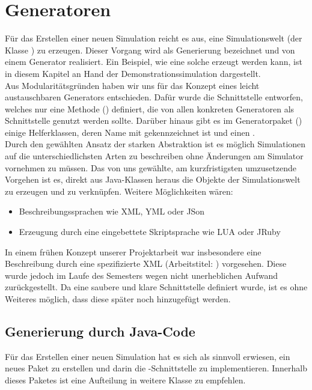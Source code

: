 \section{Generatoren}\label{subsec:real_generator}
Für das Erstellen einer neuen Simulation reicht es aus, eine Simulationswelt (der Klasse ) zu erzeugen. Dieser Vorgang wird als Generierung bezeichnet und von einem Generator realisiert.
Ein Beispiel, wie eine solche erzeugt werden kann, ist in diesem Kapitel an Hand der Demonstrationssimulation dargestellt.\\ 

Aus Modularitätsgründen haben wir uns für das Konzept eines leicht austauschbaren Generators entschieden. Dafür wurde die Schnittstelle  entworfen, welches nur eine Methode () definiert, die von allen konkreten Generatoren als Schnittstelle genutzt werden sollte.
Darüber hinaus gibt es im Generatorpaket () einige Helferklassen, deren Name mit  gekennzeichnet ist und einen .\\

Durch den gewählten Ansatz der starken Abstraktion ist es möglich Simulationen auf die unterschiedlichsten Arten zu beschreiben ohne Änderungen am Simulator vornehmen zu müssen. Das von uns gewählte, am kurzfristigsten umzusetzende Vorgehen ist es, direkt aus Java-Klassen heraus die Objekte der Simulationswelt zu erzeugen und zu verknüpfen. Weitere Möglichkeiten wären:
\begin{itemize}
  \item{Beschreibungssprachen wie XML, YML oder JSon}
  \item{Erzeugung durch eine eingebettete Skriptsprache wie LUA oder JRuby}
\end{itemize}
In einem frühen Konzept unserer Projektarbeit war insbesondere eine Beschreibung durch eine spezifizierte XML (Arbeitstitel: ) vorgesehen. Diese wurde jedoch im Laufe des Semesters wegen nicht unerheblichen Aufwand zurückgestellt. Da eine saubere und klare Schnittstelle definiert wurde, ist es ohne Weiteres möglich, dass diese später noch hinzugefügt werden.

\subsection{Generierung durch Java-Code}\label{subsec:real_generator_java}
Für das Erstellen einer neuen Simulation hat es sich als sinnvoll erwiesen, ein neues Paket zu erstellen und darin die -Schnittstelle zu implementieren. Innerhalb dieses Paketes ist eine Aufteilung in weitere Klasse zu empfehlen.


